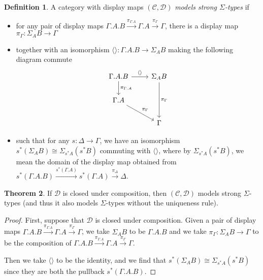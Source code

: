 \documentclass{article}
\theoremstyle{definition}
\newtheorem{definition}{Definition}[section]
\newtheorem{theorem}[definition]{Theorem}
\newcommand{\C}{\mathcal C}
\newcommand{\D}{\mathcal D}
\begin{document}
\begin{definition}
    A category with display maps $(\C, \D)$ \emph{models strong $\Sigma$-types} if 
    \begin{itemize}
        \item for any pair of display maps $\Gamma.A . B \xrightarrow{\pi_{\Gamma.A}} \Gamma. A  \xrightarrow{\pi_{\Gamma}} \Gamma$, there is a display map $\pi_\Gamma : \Sigma_A B \to \Gamma$
        \item together with an isomorphism $\langle \rangle : \Gamma. A . B \to \Sigma_A B$ making the following diagram commute
        \[
            \begin{tikzcd}
                \Gamma . A . B \ar[d, "\pi_{\Gamma.A}"] \ar[r,"\langle \rangle"] & \Sigma_A B \ar[dd,"\pi_\Gamma"] \\
                \Gamma . A \ar[dr, "\pi_{\Gamma}"] \\
                & \Gamma
            \end{tikzcd}
       \] 
       \item such that for any $s : \Delta \to \Gamma$, we have an isomorphism $ s^* (\Sigma_A B ) \cong \Sigma_{s^* A} (s ^* B)$ commuting with $\langle \rangle$, where by $\Sigma_{s^* A} (s ^* B)$, we mean the domain of the display map obtained from $s^* (\Gamma.A . B) \xrightarrow{s^* (\Gamma. A)} s^* (\Gamma. A)  \xrightarrow{\pi_{\Delta}} \Delta$.
    \end{itemize}
\end{definition}

\begin{theorem}
    If $\D$ is closed under composition, then $(\C, \D)$ models strong $\Sigma$-types (and thus it also models $\Sigma$-types without the uniqueness rule).
\end{theorem}
\begin{proof}
    First, suppose that $\D$ is closed under composition. Given a pair of display maps $\Gamma.A . B \xrightarrow{\pi_{\Gamma.A}} \Gamma. A  \xrightarrow{\pi_{\Gamma}} \Gamma$, we take $\Sigma_A B$ to be $\Gamma.A . B$ and we take $\pi_\Gamma : \Sigma_A B \to \Gamma$ to be the composition of $\Gamma.A . B \xrightarrow{\pi_{\Gamma.A}} \Gamma. A  \xrightarrow{\pi_{\Gamma}} \Gamma$.

    Then we take $\langle \rangle$ to be the identity, and we find that $ s^* (\Sigma_A B ) \cong \Sigma_{s^* A} (s ^* B)$ since they are both the pullback $s^* (\Gamma.A . B)$.
\end{proof}
\end{document}
